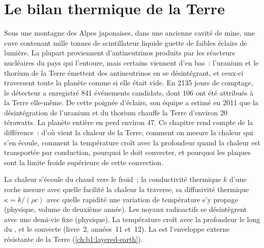 \chapter{Le bilan thermique de la Terre}\label{ch:b1:heat-budget}

Sous une montagne des Alpes japonaises, dans une ancienne cavité de mine, une
cuve contenant mille tonnes de scintillateur liquide guette de faibles éclairs
de lumière. La plupart proviennent d'antineutrinos produits par les réacteurs
nucléaires du pays qui l'entoure, mais certains viennent d'en bas~: l'uranium et
le thorium de la Terre émettent des antineutrinos en se désintégrant, et ceux-ci
traversent toute la planète comme si elle était vide. En 2135 jours de comptage,
le détecteur a enregistré 841 événements candidats, dont 106 ont été attribués à
la Terre elle-même. De cette poignée d'éclairs, son équipe a estimé en 2011 que
la désintégration de l'uranium et du thorium chauffe la Terre d'environ 20
térawatts. La planète entière en perd environ 47. Ce chapitre rend compte de la
différence~: d'où vient la chaleur de la Terre, comment on mesure la chaleur qui
s'en écoule, comment la température croît avec la profondeur quand la chaleur
est transportée par conduction, pourquoi le  doit convecter, et pourquoi
les plaques sont la limite froide supérieure de cette convection.

\begin{recall}
La chaleur s'écoule du chaud vers le froid~; la conductivité thermique $k$ d'une
roche mesure avec quelle facilité la chaleur la traverse, sa diffusivité
thermique $\kappa = k/(\rho c)$ avec quelle rapidité une variation de température
s'y propage (physique, volume de deuxième année). Les noyaux radioactifs se
désintègrent avec une demi-vie fixe (physique). La température croît avec la
profondeur le long du , et le  convecte (livre~2, années~11 et~12).
La  est l'enveloppe externe résistante de la Terre
(\cref{ch:b1:layered-earth}).
\end{recall}

